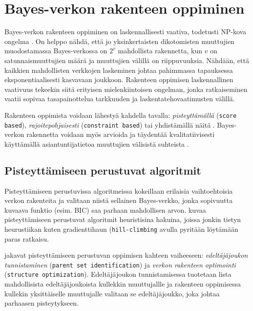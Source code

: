 \begin{center}
\end{center}

\section{Bayes-verkon rakenteen oppiminen}

Bayes-verkon rakenteen oppiminen on laskennallisesti vaativa, todetusti NP-kova ongelma \citep{chickering_large-sample_2004}. On helppo nähdä, että jo yksinkertaisten dikotomisten muuttujien muodostamassa Bayes-verkossa on $2^v$ mahdollista rakennetta, kun $v$ on satunnaismuuttujien määrä ja muuttujien välillä on riippuvuuksia. Nähdään, että kaikkien mahdollisten verkkojen laskeminen johtaa pahimmassa tapauksessa eksponentiaalisesti kasvavaan joukkoon. Rakenteen oppimisen laskennallinen vaativuus tekeekin siitä erityisen mielenkiintoisen ongelman, jonka ratkaiseminen vaatii sopivaa tasapainottelua tarkkuuden ja laskentatehovaatimusten välillä.

Rakenteen oppimista voidaan lähestyä kahdella tavalla: \emph{pisteyttämällä} (\texttt{score based}),  \emph{rajoitepohjaisesti} (\texttt{constraint based}) \citep{ramsahai_connecting_2020, scanagatta_survey_2019, mittal_review_2011, scutari_learning_2010} tai yhdistämällä näitä \citep{li_hybrid_2018}. Bayes-verkon rakennetta voidaan myös arvioida ja täydentää kvalitatiivisesti käyttämällä asiantuntijatietoa muuttujien välisistä suhteista \citep{ruggeri_bayesian_2008, myllymaki_bayes-verkkojen_1998}.

\subsection{Pisteyttämiseen perustuvat algoritmit}

Pisteyttämiseen perustuvissa algoritmeissa kokeillaan erilaisia vaihtoehtoisia verkon rakenteita ja valitaan niistä sellainen Bayes-verkko, jonka sopivuutta kuvaava funktio (esim. BIC) saa parhaan mahdollisen arvon. \citet{scutari_learning_2010} kuvaa pisteyttämiseen perustuvat algoritmit heuristisina hakuina, joissa jonkin tietyn heurustiikan kuten gradienttihaun (\texttt{hill-climbing} avulla pyritään löytämään paras ratkaisu. 

\citet{scanagatta_survey_2019} jakavat pisteyttämiseen perustuvan oppimisen kahteen vaiheeseen: \emph{edeltäjäjoukon tunnistaminen} (\texttt{parent set identification}) ja \emph{verkon rakenteen optimointi} (\texttt{structure optimization}). Edeltäjäjoukon tunnistamisessa tuotetaan lista mahdollisista edeltäjäjoukoista kullekkin muuttujallle ja rakenteen oppimisessa kullekin yksittäiselle muuttujalle valitaan se edeltäjäjoukko, joka johtaa parhaasen pisteytykseen. 

